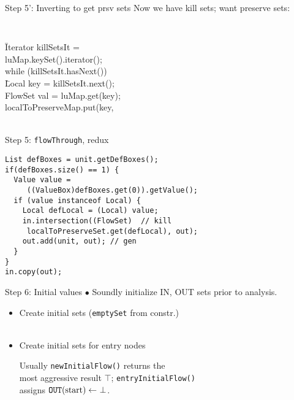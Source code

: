 \begin{slide}{Step 5': Inverting to get prsv sets}
Now we have kill sets; want preserve sets:
{\tt \small
\begin{tabbing}
\quad \= Iterator killSetsIt = \\
      \> \qquad \qquad luMap.keySet().iterator(); \\
      \> while (killSetsIt.hasNext())\\
      \> \qquad \= Local key = killSetsIt.next();\\
      \>        \> FlowSet val = luMap.get(key);\\
      \>        \> {\green localToPreserveMap.put(key,} \\
      \>        \> \qquad {} \\
\end{tabbing}
}

\end{slide}

\begin{slide}{Step 5: {\tt flowThrough}, redux}
\vspace*{-0.15in}
{\small
\begin{verbatim}
List defBoxes = unit.getDefBoxes();
if(defBoxes.size() == 1) {
  Value value = 
     ((ValueBox)defBoxes.get(0)).getValue();
  if (value instanceof Local) {
    Local defLocal = (Local) value;    
    in.intersection((FlowSet)  // kill
     localToPreserveSet.get(defLocal), out);
    out.add(unit, out); // gen
  }
}
in.copy(out);
\end{verbatim}}
\end{slide}

\begin{slide}{Step 6: Initial values}
\vspace*{-0.1in}
$\bullet$ Soundly initialize IN, OUT sets prior to analysis.

\begin{itemize}

\item Create initial sets ({\tt emptySet} from constr.)\\
\\

\item Create initial sets for entry nodes\\

\vspace*{0.09in}

Usually {\tt newInitialFlow()} returns the \\ \quad most aggressive result
$\top$; {\tt entryInitialFlow()} \\ \quad assigns
 $\mbox{\tt OUT}(\mbox{start}) 
\leftarrow\ \perp$.
\end{itemize}
\end{slide}

